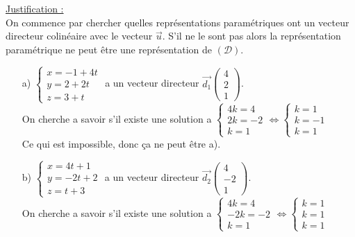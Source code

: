 \documentclass[a4paper, 12pt]{article}
\begin{document}
\noindent
\underline{Justification :}
\\
On commence par chercher quelles représentations paramétriques ont un vecteur directeur colinéaire avec le vecteur $\vec{u}$. S'il ne le sont pas alors la représentation paramétrique 
ne peut être une représentation de $(\mathcal{D})$. 
\vspace{3mm}
\begin{itemize}
    \item[a)] $\begin{cases} x = -1 + 4t \\ y = 2 + 2t \\ z = 3 + t \end{cases}$ a un vecteur directeur $\vec{d_1}\begin{pmatrix} 4 \\ 2 \\ 1 \end{pmatrix}$. 
    \\On cherche a savoir s'il existe une solution a $\begin{cases} 4k = 4 \\ 2k = -2 \\ k = 1 \end{cases} \Leftrightarrow \begin{cases} k = 1 \\ k = -1 \\k = 1 \end{cases}$ 
    \\Ce qui est impossible, donc ça ne peut être a). \vspace{5mm}
    \item[b)]  $\begin{cases} x = 4t + 1 \\ y = -2t + 2 \\ z = t + 3 \end{cases}$ a un vecteur directeur $\vec{d_2}\begin{pmatrix} 4 \\ -2 \\ 1 \end{pmatrix}$. 
    \\On cherche a savoir s'il existe une solution a $\begin{cases} 4k = 4 \\ -2k = -2 \\ k = 1 \end{cases} \Leftrightarrow \begin{cases} k = 1 \\ k = 1 \\k = 1 \end{cases}$ 

\end{itemize}
\end{document}
